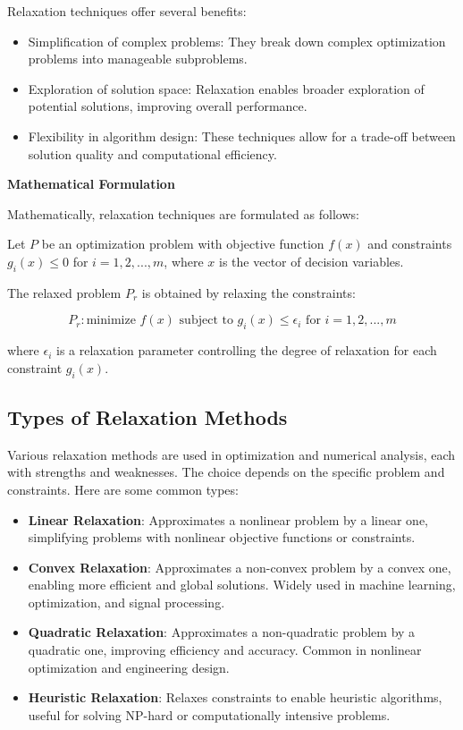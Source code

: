 \documentclass[12pt]{book} %
\begin{document}
Relaxation techniques offer several benefits:

\begin{itemize}
    \item Simplification of complex problems: They break down complex optimization problems into manageable subproblems.
    \item Exploration of solution space: Relaxation enables broader exploration of potential solutions, improving overall performance.
    \item Flexibility in algorithm design: These techniques allow for a trade-off between solution quality and computational efficiency.
\end{itemize}

\textbf{Mathematical Formulation}

Mathematically, relaxation techniques are formulated as follows:

Let \(P\) be an optimization problem with objective function \(f(x)\) and constraints \(g_i(x) \leq 0\) for \(i = 1, 2, ..., m\), where \(x\) is the vector of decision variables.

The relaxed problem \(P_r\) is obtained by relaxing the constraints:

\[
P_r: \text{minimize } f(x) \text{ subject to } g_i(x) \leq \epsilon_i \text{ for } i = 1, 2, ..., m
\]

where \(\epsilon_i\) is a relaxation parameter controlling the degree of relaxation for each constraint \(g_i(x)\).

\subsection{Types of Relaxation Methods}

Various relaxation methods are used in optimization and numerical analysis, each with strengths and weaknesses. The choice depends on the specific problem and constraints. Here are some common types:

\begin{itemize}
    \item \textbf{Linear Relaxation}: Approximates a nonlinear problem by a linear one, simplifying problems with nonlinear objective functions or constraints.
    
    \item \textbf{Convex Relaxation}: Approximates a non-convex problem by a convex one, enabling more efficient and global solutions. Widely used in machine learning, optimization, and signal processing.
    
    \item \textbf{Quadratic Relaxation}: Approximates a non-quadratic problem by a quadratic one, improving efficiency and accuracy. Common in nonlinear optimization and engineering design.
    
    \item \textbf{Heuristic Relaxation}: Relaxes constraints to enable heuristic algorithms, useful for solving NP-hard or computationally intensive problems.
\end{itemize}
\end{document}
